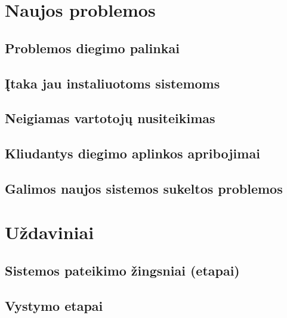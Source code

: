 \documentclass[12pt]{article}
\begin{document}


\newpage

\section{Naujos problemos}
\subsection{Problemos diegimo palinkai}

\subsection{Įtaka jau instaliuotoms sistemoms}

\subsection{Neigiamas vartotojų nusiteikimas}

\subsection{Kliudantys diegimo aplinkos apribojimai}

\subsection{Galimos naujos sistemos sukeltos problemos}

\newpage

\section{Uždaviniai}
\subsection{Sistemos pateikimo žingsniai (etapai)}

\subsection{Vystymo etapai}
\end{document}

